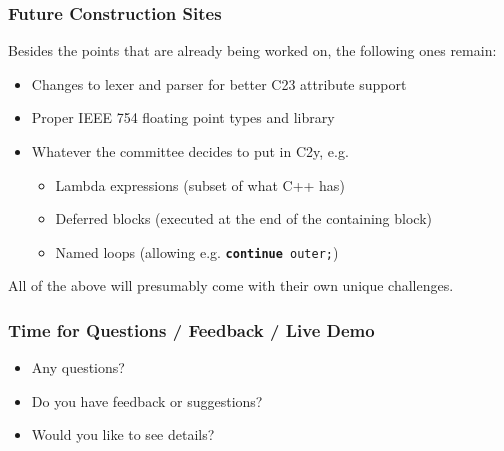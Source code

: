 \documentclass[xcolor=dvipsnames]{beamer}
\begin{document}
\begin{frame}
	\frametitle{Future Construction Sites}
	Besides the points that are already being worked on, the following ones remain:
	\begin{itemize}
		\item Changes to lexer and parser for better C23 attribute support
		\item Proper IEEE 754 floating point types and library
		\item Whatever the committee decides to put in C2y, e.g.
		\begin{itemize}
			\item Lambda expressions (subset of what C++ has)
			\item Deferred blocks (executed at the end of the containing block)
			\item Named loops (allowing e.g. \texttt{\textbf{continue} outer;})
		\end{itemize}
	\end{itemize}
	All of the above will presumably come with their own unique challenges.
\end{frame}

\begin{frame}
	\frametitle{Time for Questions / Feedback / Live Demo}
	
	\begin{itemize}
		\item Any questions?
		\item Do you have feedback or suggestions?
		\item Would you like to see details?
	\end{itemize}
\end{frame}
\end{document}
